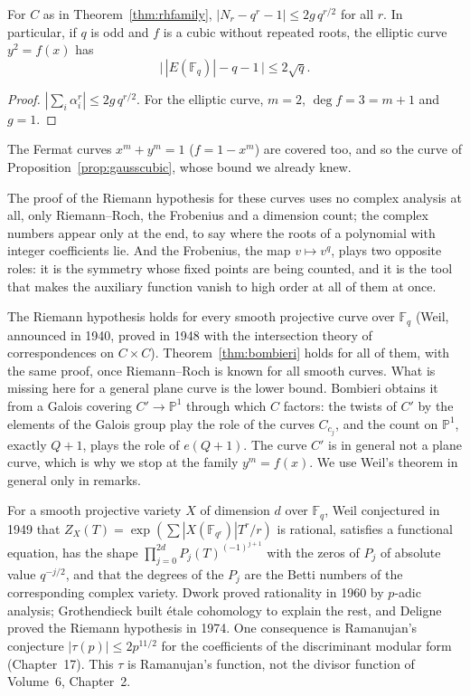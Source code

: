 \begin{corollary}[Hasse, 1933]\label{cor:hasse}
For $C$ as in Theorem~\ref{thm:rhfamily}, $|N_r-q^r-1|\le2g\,q^{r/2}$ for all $r$. In particular, if $q$ is odd and $f$ is a cubic without repeated roots,
the elliptic curve $y^2=f(x)$ has
\[
\bigl|\,|E(\mathbb F_q)|-q-1\,\bigr|\le2\sqrt q.
\]
\end{corollary}
\begin{proof}
$|\sum_i\alpha_i^r|\le2g\,q^{r/2}$. For the elliptic curve, $m=2$, $\deg f=3=m+1$ and $g=1$.
\end{proof}

The Fermat curves $x^m+y^m=1$ ($f=1-x^m$) are covered too, and so the curve of Proposition~\ref{prop:gausscubic}, whose bound we already knew.

\begin{beauty}
The proof of the Riemann hypothesis for these curves uses no complex analysis at all, only Riemann--Roch, the Frobenius and a dimension count; the complex numbers
appear only at the end, to say where the roots of a polynomial with integer coefficients lie. And the Frobenius, the map $v\mapsto v^q$, plays two opposite roles:
it is the symmetry whose fixed points are being counted, and it is the tool that makes the auxiliary function vanish to high order at all of them at once.
\end{beauty}

\begin{remark}
The Riemann hypothesis holds for every smooth projective curve over $\mathbb F_q$ (Weil, announced in 1940, proved in 1948 with the intersection theory of
correspondences on $C\times C$). Theorem~\ref{thm:bombieri} holds for all of them, with the same proof, once Riemann--Roch is known for all smooth curves. What is
missing here for a general plane curve is the lower bound. Bombieri obtains it from a Galois covering $C'\to\mathbb P^1$ through which $C$ factors: the
twists of $C'$ by the elements of the Galois group play the role of the curves $C_{c_j}$, and the count on $\mathbb P^1$, exactly $Q+1$, plays the role of
$e(Q+1)$. The curve $C'$ is in general not a plane curve, which is why we stop at the family $y^m=f(x)$. We use Weil's theorem in general only in remarks.
\end{remark}

\begin{remark}
For a smooth projective variety $X$ of dimension $d$ over $\mathbb F_q$, Weil conjectured in 1949 that $Z_X(T)=\exp(\sum|X(\mathbb F_{q^r})|T^r/r)$ is rational,
satisfies a functional equation, has the shape $\prod_{j=0}^{2d}P_j(T)^{(-1)^{j+1}}$ with the zeros of $P_j$ of absolute value $q^{-j/2}$, and that the degrees of the
$P_j$ are the Betti numbers of the corresponding complex variety. Dwork proved rationality in 1960 by $p$-adic analysis; Grothendieck built \'etale cohomology to
explain the rest, and Deligne proved the Riemann hypothesis in 1974. One consequence is Ramanujan's conjecture $|\tau(p)|\le2p^{11/2}$ for the coefficients of the
discriminant modular form (Chapter~17). This $\tau$ is Ramanujan's function, not the divisor function of Volume~6, Chapter~2.
\end{remark}

